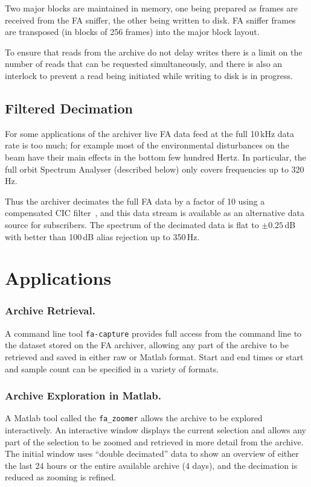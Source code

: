 \documentclass{JAC2003}
\begin{document}
Two major blocks are maintained in memory, one being prepared as frames are
received from the FA sniffer, the other being written to disk.  FA sniffer
frames are transposed (in blocks of 256 frames) into the major block layout.

To ensure that reads from the archive do not delay writes there is a limit on
the number of reads that can be requested simultaneously, and there is also an
interlock to prevent a read being initiated while writing to disk is in
progress.


\subsection{Filtered Decimation}

For some applications of the archiver live FA data feed at the full 10\,kHz data
rate is too much; for example most of the environmental disturbances on the beam
have their main effects in the bottom few hundred Hertz.  In particular, the
full orbit Spectrum Analyser (described below) only covers frequencies up to
320\,Hz.

Thus the archiver decimates the full FA data by a factor of 10 using a
compensated CIC filter~\cite{hogenauer, altera}, and this data stream is
available as an alternative data source for subscribers.  The spectrum of the
decimated data is flat to $\pm0.25$\,dB with better than 100\,dB alias rejection
up to 350\,Hz.


\section{Applications}


\subsubsection{Archive Retrieval.}

A command line tool \texttt{fa-capture} provides full access from the command
line to the dataset stored on the FA archiver, allowing any part of the archive
to be retrieved and saved in either raw or Matlab format.  Start and end times
or start and sample count can be specified in a variety of formats.

\subsubsection{Archive Exploration in Matlab.}

A Matlab tool called the \texttt{fa\_zoomer} allows the archive to be explored
interactively.  An interactive window displays the current selection and allows
any part of the selection to be zoomed and retrieved in more detail from the
archive.  The initial window uses ``double decimated'' data to show an overview
of either the last 24 hours or the entire available archive (4\textonehalf{}
days), and the decimation is reduced as zooming is refined.
\end{document}
